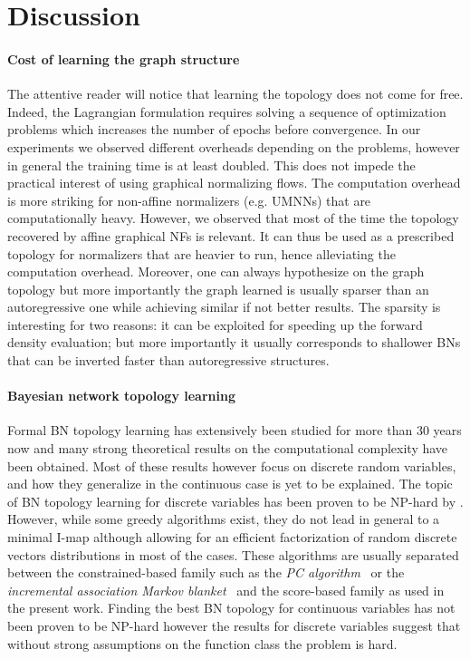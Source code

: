 


\section{Discussion}
\paragraph{Cost of learning the graph structure}
The attentive reader will notice that learning the topology does not come for free. Indeed, the Lagrangian formulation requires solving a sequence of optimization problems which increases the number of epochs before convergence. In our experiments we observed different overheads depending on the problems, however in general the training time is at least doubled. This does not impede the practical interest of using graphical normalizing flows. The computation overhead is more striking for non-affine normalizers (e.g. UMNNs) that are computationally heavy. However, we observed that most of the time the topology recovered by affine graphical NFs is relevant. It can thus be used as a prescribed topology for normalizers that are heavier to run, hence alleviating the computation overhead. Moreover, one can always hypothesize on the graph topology but more importantly the graph learned is usually sparser than an autoregressive one while achieving similar if not better results. The sparsity is interesting for two reasons: it can be exploited for speeding up the forward density evaluation; but more importantly it usually corresponds to shallower BNs that can be inverted faster than autoregressive structures.
\paragraph{Bayesian network topology learning}
Formal BN topology learning has extensively been studied for more than 30 years now and many strong theoretical results on the computational complexity have been obtained. Most of these results however focus on discrete random variables, and how they generalize in the continuous case is yet to be explained. The topic of BN topology learning for discrete variables has been proven to be NP-hard by \citet{chickering-NP-hard}. However, while some greedy algorithms exist, they do not lead in general to a minimal I-map although allowing for an efficient factorization of random discrete vectors distributions in most of the cases. These algorithms are usually separated between the constrained-based family such as the \textit{PC algorithm}~\citep{pc-algorithm} or the \textit{incremental association Markov blanket}~\citep{PGM-book} and the score-based family as used in the present work.
Finding the best BN topology for continuous variables has not been proven to be NP-hard however the results for discrete variables suggest that without strong assumptions on the function class the problem is hard.

